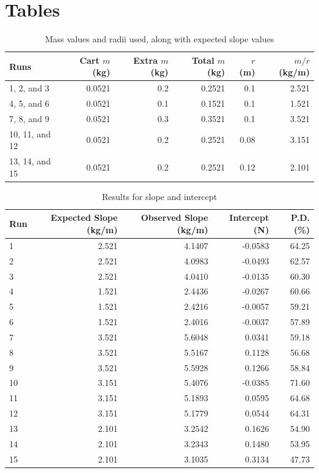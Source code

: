 \section{Tables}
\begin{table}[ht]
    \centering
    \begin{tabular}{|l|r|r|r|r|r|}
        \hline
        Runs & Cart $m$ (kg) & Extra $m$ (kg) & Total $m$ (kg) & $r$ (m) & $m / r$ (kg/m) \\
        \hline
        1, 2, and 3 & 0.0521 & 0.2 & 0.2521 & 0.1 & 2.521 \\
        4, 5, and 6 & 0.0521 & 0.1 & 0.1521 & 0.1 & 1.521 \\
        7, 8, and 9 & 0.0521 & 0.3 & 0.3521 & 0.1 & 3.521 \\
        10, 11, and 12 & 0.0521 & 0.2 & 0.2521 & 0.08 & 3.151 \\
        13, 14, and 15 & 0.0521 & 0.2 & 0.2521 & 0.12 & 2.101 \\
        \hline
    \end{tabular}
    \caption{Mass values and radii used, along with expected slope values}
    \label{table:10.m.r}
\end{table}
\begin{table}[ht]
    \centering
    \begin{tabular}{|l|r|r|r|r|}
        \hline
        Run & Expected Slope (kg/m) & Observed Slope (kg/m) & Intercept (N) & P.D. (\%) \\
        \hline
        1 & 2.521 & 4.1407 & -0.0583 & 64.25 \\
        2 & 2.521 & 4.0983 & -0.0493 & 62.57 \\
        3 & 2.521 & 4.0410 & -0.0135 & 60.30 \\
        \hline
        4 & 1.521 & 2.4436 & -0.0267 & 60.66 \\
        5 & 1.521 & 2.4216 & -0.0057 & 59.21 \\
        6 & 1.521 & 2.4016 & -0.0037 & 57.89 \\
        \hline
        7 & 3.521 & 5.6048 & 0.0341 & 59.18 \\
        8 & 3.521 & 5.5167 & 0.1128 & 56.68 \\
        9 & 3.521 & 5.5928 & 0.1266 & 58.84 \\
        \hline
        10 & 3.151 & 5.4076 & -0.0385 & 71.60 \\
        11 & 3.151 & 5.1893 & 0.0595 & 64.68 \\
        12 & 3.151 & 5.1779 & 0.0544 & 64.31 \\
        \hline
        13 & 2.101 & 3.2542 & 0.1626 & 54.90 \\
        14 & 2.101 & 3.2343 & 0.1480 & 53.95 \\
        15 & 2.101 & 3.1035 & 0.3134 & 47.73 \\
        \hline
    \end{tabular}
    \caption{Results for slope and intercept}
    \label{table:10.results}
\end{table}
